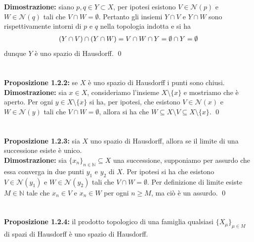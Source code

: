 \documentclass{article}
\begin{document}
\textbf{Dimostrazione:} siano $p, q \in Y \subset X$, per ipotesi esistono $V \in \mathcal{N}(p)$ e $W \in \mathcal{N}(q)$ tali che $V \cap W = \emptyset$. Pertanto gli insiemi $Y \cap V$ e $Y \cap W$ sono rispettivamente intorni di $p$ e $q$ nella topologia indotta e si ha
\begin{gather}
    (Y \cap V) \cap (Y \cap W) = V \cap W \cap Y = \emptyset \cap Y = \emptyset \notag
\end{gather}
dunque $Y$ è uno spazio di Hausdorff. \qed \\ \\ \\
\textbf{Proposizione 1.2.2:} se $X$ è uno spazio di Hausdorff i punti sono chiusi. \\

\textbf{Dimostrazione:} sia $x \in X$, consideriamo l'insieme $X \setminus \{ x \}$ e mostriamo che è aperto. Per ogni $y \in X \setminus \{ x \}$ si ha, per ipotesi, che esistono $V \in \mathcal{N}(x)$ e $W \in \mathcal{N}(y)$ tali che $V \cap W = \emptyset$, allora si ha che $W \subseteq X \setminus V \subseteq X \setminus \{ x \}$. \qed \\ \\ \\
\textbf{Proposizione 1.2.3:} sia $X$ uno spazio di Hausdorff, allora se il limite di una successione esiste è unico. \\

\textbf{Dimostrazione:} sia $\{ x_n \}_{n \in \mathbb{N}} \subseteq X$ una successione, supponiamo per assurdo che essa converga in due punti $y_1$ e $y_2$ di $X$. Per ipotesi si ha che esistono $V \in \mathcal{N}(y_1)$ e $W \in \mathcal{N}(y_2)$ tali che $V \cap W = \emptyset$. Per definizione di limite esiste $M \in \mathbb{N}$ tale che $x_n \in V$ e $x_n \in W$ per ogni $n \geq M$, ma ciò è un assurdo. \qed \\ \\ \\
\textbf{Proposizione 1.2.4:} il prodotto topologico di una famiglia qualsiasi $\{ X_\mu \}_{\mu \in M}$ di spazi di Hausdorff è uno spazio di Hausdorff. \\
\end{document}

